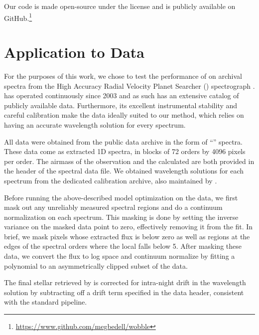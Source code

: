 \documentclass[modern]{aastex62}
\begin{document}
{Our code is made open-source under the  license and is publicly available on GitHub.\footnote{\url{https://www.github.com/megbedell/wobble}}



\section{Application to \HARPS Data}
\label{s:results}

For the purposes of this work, we chose to test the performance of \wobble on archival spectra from the High Accuracy Radial Velocity Planet Searcher (\HARPS) spectrograph \citep{Mayor2003}. 
\HARPS has operated continuously since 2003 and as such has an extensive catalog of publicly available data. 
Furthermore, its excellent instrumental stability and careful calibration make the data ideally suited to our method, which relies on having an accurate wavelength solution for every spectrum. 

All data were obtained from the  public data archive in the form of ``'' spectra. 
These data come as extracted 1D spectra, in blocks of 72 orders by 4096 pixels per order.
The airmass of the observation and the calculated \BERV are both provided in the  header of the spectral data file. 
We obtained wavelength solutions for each spectrum from the dedicated \HARPS calibration archive, also maintained by . 

Before running the above-described model optimization on the data, we first mask out any unreliably measured spectral regions and do a continuum normalization on each spectrum. 
This masking is done by setting the inverse variance on the masked data point to zero, effectively removing it from the fit. 
In brief, we mask pixels whose extracted flux is below zero as well as regions at the edges of the spectral orders where the local \SNR falls below 5. 
After masking these data, we convert the flux to log space and continuum normalize by fitting a polynomial to an asymmetrically clipped subset of the data. 

The final stellar \RV retrieved by \wobble is corrected for intra-night drift in the wavelength solution by subtracting off a drift term specified in the data header, consistent with the standard \HARPS pipeline. 

}
\end{document}
